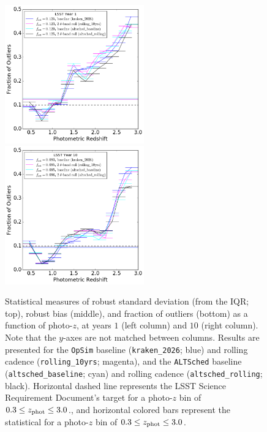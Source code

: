 \begin{figure}
\begin{center}
\includegraphics[width=6cm,trim={0cm 0cm 0cm 0cm},clip]{figures/ALTyear1_fout.png}
\includegraphics[width=6cm,trim={0cm 0cm 0cm 0cm},clip]{figures/ALTyear10_fout.png}
\caption{\small{Statistical measures of robust standard deviation (from the IQR; top), robust bias (middle), and fraction of outliers (bottom) as a function of photo-$z$, at years $1$ (left column) and $10$ (right column). Note that the $y$-axes are not matched between columns. Results are presented for the {\tt OpSim} baseline ({\tt kraken\_2026}; blue) and rolling cadence ({\tt rolling\_10yrs}; magenta), and the {\tt ALTSched} baseline ({\tt altsched\_baseline}; cyan) and rolling cadence ({\tt altsched\_rolling}; black). Horizontal dashed line represents the LSST Science Requirement Document's target for a photo-$z$ bin of $0.3 \leq z_{\rm phot} \leq 3.0$., and horizontal colored bars represent the statistical for a photo-$z$ bin of $0.3 \leq z_{\rm phot} \leq 3.0$.} \label{fig:stats_altsched}}
\end{center}
\end{figure}

